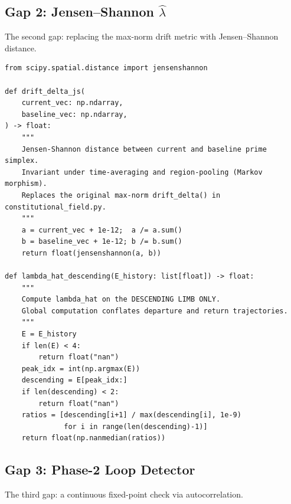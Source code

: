 \documentclass[12pt,a4paper]{article}
\theoremstyle{plain}
\theoremstyle{definition}
\newcommand{\hatlambda}{\hat{\lambda}}
\begin{document}
\subsection{Gap 2: Jensen--Shannon $\hatlambda$}
\label{sec:code:gap2}

The second gap: replacing the max-norm drift metric with Jensen--Shannon distance.

\begin{lstlisting}[style=orfpython, caption={Gap 2 --- JS distance replaces max-norm (\texttt{constitutional\_field\_patch.py})}]
from scipy.spatial.distance import jensenshannon

def drift_delta_js(
    current_vec: np.ndarray,
    baseline_vec: np.ndarray,
) -> float:
    """
    Jensen-Shannon distance between current and baseline prime simplex.
    Invariant under time-averaging and region-pooling (Markov morphism).
    Replaces the original max-norm drift_delta() in constitutional_field.py.
    """
    a = current_vec + 1e-12;  a /= a.sum()
    b = baseline_vec + 1e-12; b /= b.sum()
    return float(jensenshannon(a, b))

def lambda_hat_descending(E_history: list[float]) -> float:
    """
    Compute lambda_hat on the DESCENDING LIMB ONLY.
    Global computation conflates departure and return trajectories.
    """
    E = E_history
    if len(E) < 4:
        return float("nan")
    peak_idx = int(np.argmax(E))
    descending = E[peak_idx:]
    if len(descending) < 2:
        return float("nan")
    ratios = [descending[i+1] / max(descending[i], 1e-9)
              for i in range(len(descending)-1)]
    return float(np.nanmedian(ratios))
\end{lstlisting}

\subsection{Gap 3: Phase-2 Loop Detector}
\label{sec:code:gap3}

The third gap: a continuous fixed-point check via autocorrelation.
\end{document}
